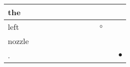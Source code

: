 \documentclass[landscape]{article}
\newcommand{\ssp}{\hspace{2pt}}
\newcommand{\mex}{\cellcolor{g}$\bullet$}
\newcommand{\map}{\cellcolor{y}$\boldsymbol\circ$}
\begin{document}
\begin{tabular}{|l|p{10pt}|p{10pt}|p{10pt}|p{10pt}|p{10pt}|p{10pt}|p{10pt}|p{10pt}|p{10pt}|p{10pt}|p{10pt}|}
\hline
\ssp the \ssp&\hspace{2pt}&\hspace{2pt}&\hspace{2pt}&\hspace{2pt}&\hspace{2pt}&\hspace{2pt}&\hspace{2pt}&\hspace{2pt}&\hspace{2pt}&\hspace{2pt}&\hspace{2pt}\\
\hline
\ssp \cellcolor{ref8}left \ssp&\hspace{2pt}&\hspace{2pt}&\hspace{2pt}&\hspace{2pt}&\hspace{2pt}&\hspace{2pt}&\hspace{2pt}&\hspace{2pt}&\hspace{2pt}\map&\hspace{2pt}&\hspace{2pt}\\
\hline
\ssp nozzle \ssp&\hspace{2pt}&\hspace{2pt}&\hspace{2pt}&\hspace{2pt}&\hspace{2pt}&\hspace{2pt}&\hspace{2pt}&\hspace{2pt}&\hspace{2pt}&\hspace{2pt}&\hspace{2pt}\\
\hline
\ssp \cellcolor{ref10}. \ssp&\hspace{2pt}&\hspace{2pt}&\hspace{2pt}&\hspace{2pt}&\hspace{2pt}&\hspace{2pt}&\hspace{2pt}&\hspace{2pt}&\hspace{2pt}&\hspace{2pt}&\hspace{2pt}\mex\\
\hline
\end{tabular}
\end{document}

